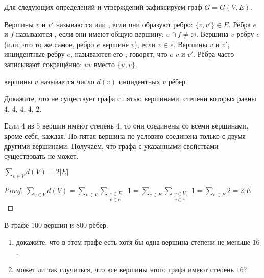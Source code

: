 Для следующих определений и утверждений зафиксируем граф $ G = G(V, E) $.
\begin{definition}
    Вершины $ v $ и $ v' $ называются  или , если они образуют ребро: $ \{v, v'\} \in E $.
    Рёбра $ e $ и $ f $ называются , если они имеют общую вершину: $ e \cap f \neq \varnothing $.
    Вершина $ v $  ребру $ e $ (или, что то же самое, ребро $ e $  вершине $ v $), если $ v \in e $.
    Вершины $ v $ и $ v' $, инцидентные ребру $ e $, называются его ;
    говорят, что $ e $  $ v $ и $ v' $.
    Рёбра часто записывают сокращённо: $ uv $ вместо $ \{u, v\} $.
\end{definition}

\begin{definition}
     вершины $ v $ называется число $ d(v) $ инцидентных $ v $ рёбер.
\end{definition}

\begin{Exercise}[counter=SecExercise, label={exercise:graphs:inconsistent_degrees}]
    \noindent
    Докажите, что не существует графа с пятью вершинами,
    степени которых равны $ 4 $, $ 4 $, $ 4 $, $ 4 $, $ 2 $.
\end{Exercise}

\begin{Answer}
    \noindent
    Если $ 4 $ из $ 5 $ вершин имеют степень $ 4 $, то они соединены со всеми вершинами, кроме себя, каждая.
    Но пятая вершина по условию соединена только с двумя другими вершинами.
    Получаем, что графа с указанными свойствами существовать не может.
\end{Answer}

\begin{theorem}[о рукопожатиях]
    \label{theorem:graphs:sum_of_degs}
    $ \displaystyle \sum_{v \in V} d(V) = 2 |E| $
\end{theorem}

\begin{proof}
    $ \displaystyle \sum_{v \in V} d(V) = \sum_{v \in V} \sum_{\substack{e \in E, \\ v \in e}} 1 = \sum_{e \in E} \sum_{\substack{v \in V, \\ v \in e}} 1 = \sum_{e \in E} 2 = 2 |E| $
\end{proof}

\begin{Exercise}[counter=SecExercise, label={exercise:graphs:sum_of_degs_less}]
    \noindent
    В графе $ 100 $ вершин и $ 800 $ рёбер.
    \begin{enumerate}[label=\textbf{\alph*)}]
        \item
            докажите, что в этом графе есть хотя бы одна вершина степени не меньше $ 16 $.
        \item
            может ли так случиться, что все вершины этого графа имеют степень $ 16 $?
    \end{enumerate}
\end{Exercise}


